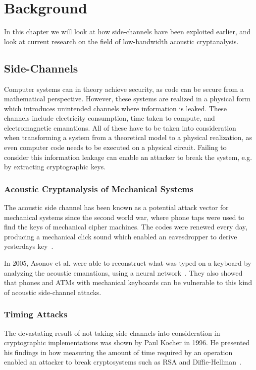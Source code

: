 \chapter{Background}\label{chp:background} 
In this chapter we will look at how side-channels have been exploited earlier, and look at current research on the field of low-bandwidth acoustic cryptanalysis.


\section{Side-Channels}\label{chp2:sec:side_channel}
Computer systems can in theory achieve security, as code can be secure from a mathematical perspective.
However, these systems are realized in a physical form which introduces unintended channels where information is leaked.
These channels include electricity consumption, time taken to compute, and electromagnetic emanations. 
All of these have to be taken into consideration when transforming a system from a theoretical model to a physical realization, as even computer code needs to be executed on a physical circuit.
Failing to consider this information leakage can enable an attacker to break the system, e.g. by extracting cryptographic keys.

\subsection{Acoustic Cryptanalysis of Mechanical Systems}\label{chp2:subsec:acoustic_cryptanalysis}
The acoustic side channel has been known as a potential attack vector for mechanical systems since the second world war, where phone taps were used to find the keys of mechanical cipher machines. 
The codes were renewed every day, producing a mechanical click sound which enabled an eavesdropper to derive yesterdays key~\cite[pp. 103-107]{wright1988spycatcher}.

In 2005, Asonov et al. were able to reconstruct what was typed on a keyboard by analyzing the acoustic emanations, using a neural network~\cite{DBLP:conf/sp/AsonovA04}. 
They also showed that phones and ATMs with mechanical keyboards can be vulnerable to this kind of acoustic side-channel attacks.

\subsection{Timing Attacks}\label{chp2:subsec:timing_attacks}
The devastating result of not taking side channels into consideration in cryptographic implementations was shown by Paul Kocher in 1996. 
He presented his findings in how measuring the amount of time required by an operation enabled an attacker to break cryptosystems such as RSA and Diffie-Hellman~\cite{DBLP:conf/crypto/Kocher96}.

